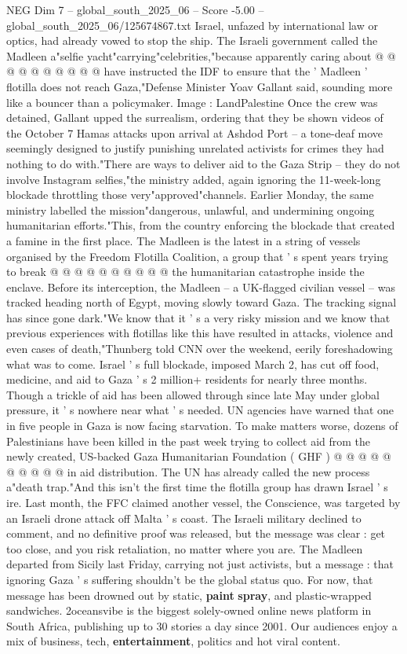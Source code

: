 \begin{textsample}{NEG Dim 7 – global\_south\_2025\_06 – Score -5.00 – global\_south\_2025\_06/125674867.txt}
Israel, unfazed by international law or optics, had already vowed to stop the ship.
The Israeli government called the Madleen a"selfie yacht"carrying"celebrities,"because apparently caring about @ @ @ @ @ @ @ @ @ @ have instructed the IDF to ensure that the ' Madleen ' flotilla does not reach Gaza,"Defense Minister Yoav Gallant said, sounding more like a bouncer than a policymaker.
Image : LandPalestine Once the crew was detained, Gallant upped the surrealism, ordering that they be shown videos of the October 7 Hamas attacks upon arrival at Ashdod Port -- a tone-deaf move seemingly designed to justify punishing unrelated activists for crimes they had nothing to do with."There are ways to deliver aid to the Gaza Strip -- they do not involve Instagram selfies,"the ministry added, again ignoring the 11-week-long blockade throttling those very"approved"channels.
Earlier Monday, the same ministry labelled the mission"dangerous, unlawful, and undermining ongoing humanitarian efforts."This, from the country enforcing the blockade that created a famine in the first place.
The Madleen is the latest in a string of vessels organised by the Freedom Flotilla Coalition, a group that ' s spent years trying to break @ @ @ @ @ @ @ @ @ @ the humanitarian catastrophe inside the enclave.
Before its interception, the Madleen -- a UK-flagged civilian vessel -- was tracked heading north of Egypt, moving slowly toward Gaza.
The tracking signal has since gone dark."We know that it ' s a very risky mission and we know that previous experiences with flotillas like this have resulted in attacks, violence and even cases of death,"Thunberg told CNN over the weekend, eerily foreshadowing what was to come.
Israel ' s full blockade, imposed March 2, has cut off food, medicine, and aid to Gaza ' s 2 million+ residents for nearly three months.
Though a trickle of aid has been allowed through since late May under global pressure, it ' s nowhere near what ' s needed.
UN agencies have warned that one in five people in Gaza is now facing starvation.
To make matters worse, dozens of Palestinians have been killed in the past week trying to collect aid from the newly created, US-backed Gaza Humanitarian Foundation ( GHF ) @ @ @ @ @ @ @ @ @ @ in aid distribution.
The UN has already called the new process a"death trap."And this isn't the first time the flotilla group has drawn Israel ' s ire.
Last month, the FFC claimed another vessel, the Conscience, was targeted by an Israeli drone attack off Malta ' s coast.
The Israeli military declined to comment, and no definitive proof was released, but the message was clear : get too close, and you risk retaliation, no matter where you are.
The Madleen departed from Sicily last Friday, carrying not just activists, but a message : that ignoring Gaza ' s suffering shouldn't be the global status quo.
For now, that message has been drowned out by static, \textbf{paint} \textbf{spray}, and plastic-wrapped sandwiches. 2oceansvibe is the biggest solely-owned online news platform in South Africa, publishing up to 30 stories a day since 2001.
Our audiences enjoy a mix of business, tech, \textbf{entertainment}, politics and hot viral content.


\end{textsample}
